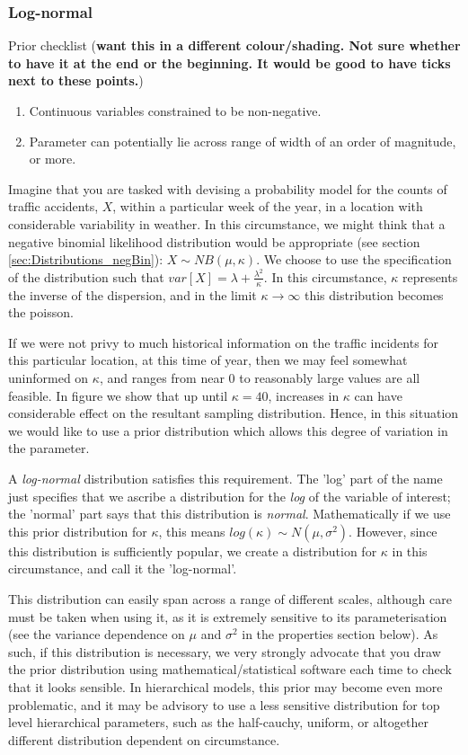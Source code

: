\documentclass[11pt,fullpage]{book}
\begin{document}
\subsubsection{Log-normal}
Prior checklist (\textbf{want this in a different colour/shading. Not sure whether to have it at the end or the beginning. It would be good to have ticks next to these points.})

\begin{enumerate} 
\item Continuous variables constrained to be non-negative.
\item Parameter can potentially lie across range of width of an order of magnitude, or more.
\end{enumerate}

Imagine that you are tasked with devising a probability model for the counts of traffic accidents, $X$, within a particular week of the year, in a location with considerable variability in weather. In this circumstance, we might think that a negative binomial likelihood distribution would be appropriate (see section \ref{sec:Distributions_negBin}): $X\sim NB(\mu,\kappa)$. We choose to use the specification of the distribution such that $var[X] = \lambda + \frac{\lambda^2}{\kappa}$. In this circumstance, $\kappa$ represents the inverse of the dispersion, and in the limit $\kappa\rightarrow\infty$ this distribution becomes the poisson.

If we were not privy to much historical information on the traffic incidents for this particular location, at this time of year, then we may feel somewhat uninformed on $\kappa$, and ranges from near 0 to reasonably large values are all feasible. In figure we show that up until $\kappa=40$, increases in $\kappa$ can have considerable effect on the resultant sampling distribution. Hence, in this situation we would like to use a prior distribution which allows this degree of variation in the parameter. 

A \textit{log-normal} distribution satisfies this requirement. The 'log' part of the name just specifies that we ascribe a distribution for the \textit{log} of the variable of interest; the 'normal' part says that this distribution is \textit{normal}. Mathematically if we use this prior distribution for $\kappa$, this means $log(\kappa)\sim N(\mu,\sigma^2)$. However, since this distribution is sufficiently popular, we create a distribution for $\kappa$ in this circumstance, and call it the 'log-normal'. 

This distribution can easily span across a range of different scales, although care must be taken when using it, as it is extremely sensitive to its parameterisation (see the variance dependence on $\mu$ and $\sigma^2$ in the properties section below). As such, if this distribution is necessary, we very strongly advocate that you draw the prior distribution using mathematical/statistical software each time to check that it looks sensible. In hierarchical models, this prior may become even more problematic, and it may be advisory to use a less sensitive distribution for top level hierarchical parameters, such as the half-cauchy, uniform, or altogether different distribution dependent on circumstance. 
\end{document}

